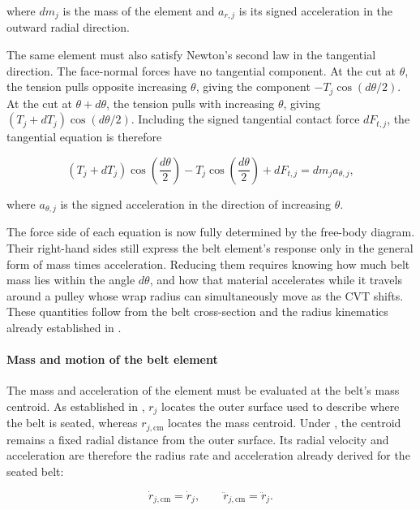 \documentclass[11pt]{report}
\numberwithin{equation}{section}
\newcounter{assump}
\begin{document}
where \(dm_j\) is the mass of the element and \(a_{r,j}\) is its signed
acceleration in the outward radial direction.

The same element must also satisfy Newton's second law in the tangential
direction. The face-normal forces have no tangential component. At the cut at
\(\theta\), the tension pulls opposite increasing \(\theta\), giving the
component \(-T_j\cos(d\theta/2)\). At the cut at
\(\theta+d\theta\), the tension pulls with increasing \(\theta\), giving
\((T_j+dT_j)\cos(d\theta/2)\). Including the signed tangential contact force
\(dF_{t,j}\), the tangential equation is therefore

\begin{equation}
    \left(T_j+dT_j\right)
    \cos\!\left(\frac{d\theta}{2}\right)
    -
    T_j\cos\!\left(\frac{d\theta}{2}\right)
    +
    dF_{t,j}
    =
    dm_j a_{\theta,j},
    \label{eq:wrap_tangential_balance_start}
\end{equation}

where \(a_{\theta,j}\) is the signed acceleration in the direction of
increasing \(\theta\).

The force side of each equation is now fully determined by the free-body
diagram. Their right-hand sides still express the belt element's response only
in the general form of mass times acceleration. Reducing them requires knowing
how much belt mass lies within the angle \(d\theta\), and how that material
accelerates while it travels around a pulley whose wrap radius can
simultaneously move as the CVT shifts. These quantities follow from the belt
cross-section and the radius kinematics already established in
.

\paragraph{Mass and motion of the belt element}

The mass and acceleration of the element must be evaluated at the belt's mass
centroid. As established in
,
\(r_j\) locates the outer surface used to describe where the belt is seated,
whereas \(r_{j,\mathrm{cm}}\) locates the mass centroid. Under
, the centroid remains a fixed radial
distance from the outer surface. Its radial velocity and acceleration are
therefore the radius rate and acceleration already derived for the seated
belt:

\[
    \dot r_{j,\mathrm{cm}}
    =
    \dot r_j,
    \qquad
    \ddot r_{j,\mathrm{cm}}
    =
    \ddot r_j.
\]
\end{document}
